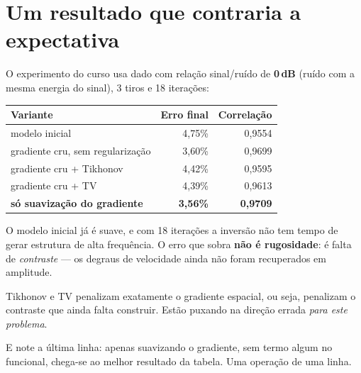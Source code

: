 \documentclass[11pt,a4paper,oneside]{report}
\begin{document}
\section{Um resultado que contraria a expectativa}

O experimento do curso usa dado com rela\c{c}\~ao sinal/ru\'ido de
\textbf{0\,dB} (ru\'ido com a mesma energia do sinal), 3 tiros e 18
itera\c{c}\~oes:

\begin{center}
\begin{tabular}{@{}lrr@{}}
\toprule
\textbf{Variante} & \textbf{Erro final} & \textbf{Correla\c{c}\~ao} \\
\midrule
modelo inicial & 4{,}75\% & 0{,}9554 \\
gradiente cru, sem regulariza\c{c}\~ao & 3{,}60\% & 0{,}9699 \\
gradiente cru + Tikhonov & 4{,}42\% & 0{,}9595 \\
gradiente cru + TV & 4{,}39\% & 0{,}9613 \\
\textbf{s\'o suaviza\c{c}\~ao do gradiente} & \textbf{3{,}56\%} & \textbf{0{,}9709} \\
\bottomrule
\end{tabular}
\end{center}

\begin{teoria}
O modelo inicial j\'a \'e suave, e com 18 itera\c{c}\~oes a invers\~ao n\~ao
tem tempo de gerar estrutura de alta frequ\^encia. O erro que sobra
\textbf{n\~ao \'e rugosidade}: \'e falta de \emph{contraste} --- os degraus de
velocidade ainda n\~ao foram recuperados em amplitude.

Tikhonov e TV penalizam exatamente o gradiente espacial, ou seja, penalizam o
contraste que ainda falta construir. Est\~ao puxando na dire\c{c}\~ao errada
\emph{para este problema}.

E note a \'ultima linha: apenas suavizando o gradiente, sem termo algum no
funcional, chega-se ao melhor resultado da tabela. Uma opera\c{c}\~ao de uma
linha.
\end{teoria}
\end{document}
